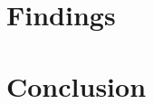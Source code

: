 \documentclass[runningheads]{llncs}
\begin{document}
\section{Findings} %




\section{Conclusion} \label{sec:conclusion}



\end{document}
